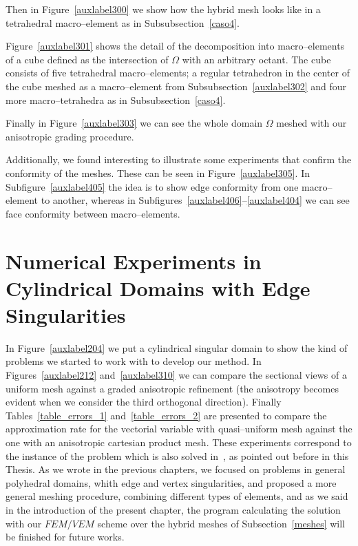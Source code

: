 Then in Figure~\ref{auxlabel300} we show how the hybrid mesh 
looks like in a tetrahedral
macro--element as in Subsubsection~\ref{caso4}. 


Figure~\ref{auxlabel301} shows the detail of the decomposition into macro--elements
of a cube defined as the intersection of $\Omega$ with an arbitrary octant. The 
cube consists of five tetrahedral macro--elements; a regular tetrahedron
in the center of the cube meshed as a macro--element from 
Subsubsection~\ref{auxlabel302} and four more macro--tetrahedra as in 
Subsubsection~\ref{caso4}.

\tauOneEnCube

Finally in Figure~\ref{auxlabel303} we can see the whole domain $\Omega$
meshed with our anisotropic grading procedure.

\tauOneEn
Additionally, we found interesting to illustrate some experiments
that confirm the conformity of the meshes. These can be seen in 
Figure~\ref{auxlabel305}. In Subfigure~\ref{auxlabel405} the idea is
to show edge conformity from one macro--element to another, whereas 
in Subfigures~\ref{auxlabel406}--\ref{auxlabel404} we can see
face conformity between macro--elements.

\conform\newpage
\section{Numerical 
Experiments in Cylindrical Domains with Edge Singularities}
\label{auxlabel215}

In Figure~\ref{auxlabel204} we put a cylindrical singular domain to show
the kind of problems we started to work with to develop our method.
\edgedomain
In Figures~\ref{auxlabel212} and~\ref{auxlabel310} we can
compare the sectional views of a uniform mesh against
a graded anisotropic refinement (the anisotropy becomes evident
when we consider the third orthogonal direction).
\gradSection
Finally Tables~\ref{table_errors_1} and~\ref{table_errors_2}
are presented to compare the approximation rate for the vectorial variable
with quasi--uniform mesh against the one with an anisotropic
cartesian product mesh. These experiments correspond to the instance of the 
problem which is also
solved in~\cite{MR1866274}, as pointed out before in this Thesis. 
As we wrote in the previous chapters, we focused on problems in general
polyhedral domains, whith edge and vertex singularities, and proposed
a more general meshing procedure, combining different types of elements, and
as we said in the introduction of the present chapter, the program calculating
the solution with our $FEM/VEM$ scheme
over the hybrid meshes of Subsection~\ref{meshes} will
be finished for future works. 

